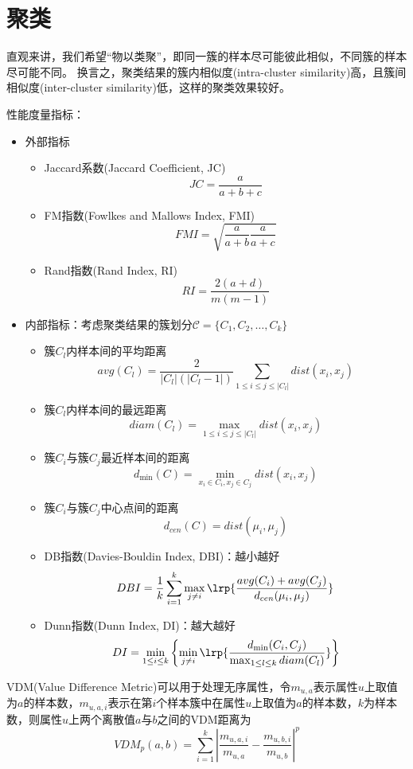 
\section{聚类}
直观来讲，我们希望“物以类聚”，即同一簇的样本尽可能彼此相似，不同簇的样本尽可能不同。
换言之，聚类结果的簇内相似度(intra-cluster similarity)高，且簇间相似度(inter-cluster similarity)低，这样的聚类效果较好。

性能度量指标：
\begin{itemize}
\item 外部指标
\begin{itemize}
	\item Jaccard系数(Jaccard Coefficient, JC)
	\[JC=\frac{a}{a+b+c}\]
	\item FM指数(Fowlkes and Mallows Index, FMI)
	\[FMI=\sqrt{\frac{a}{a+b}\frac{a}{a+c}}\]
	\item Rand指数(Rand Index, RI)
	\[RI=\frac{2(a+d)}{m(m-1)}\]
\end{itemize}
\item 内部指标：考虑聚类结果的簇划分$\mathcal{C}=\{C_1,C_2,\ldots,C_k\}$
\begin{itemize}
	\item 簇$C_l$内样本间的平均距离
	\[avg(C_l)=\frac{2}{|C_l|(|C_l-1|)}\sum_{1\leq i\leq j\leq |C_l|}dist(x_i,x_j)\]
	\item 簇$C_l$内样本间的最远距离
	\[diam(C_l)=\max_{1\leq i\leq j\leq |C_l|}dist(x_i,x_j)\]
	\item 簇$C_i$与簇$C_j$最近样本间的距离
	\[d_{\min}(C)=\min_{x_i\in C_i,x_j\in C_j}dist(x_i,x_j)\]
	\item 簇$C_i$与簇$C_j$中心点间的距离
	\[d_{cen}(C)=dist(\mu_i,\mu_j)\]
	\item DB指数(Davies-Bouldin Index, DBI)：越小越好
	\[DBI=\frac{1}{k}\sum_{i=1}^k\max_{j\ne i}\lrp{\frac{avg(C_i)+avg(C_j)}{d_{cen}(\mu_i,\mu_j)}}\]
	\item Dunn指数(Dunn Index, DI)：越大越好
	\[DI=\min_{1\leq i\leq k}\left\{\min_{j\ne i}\lrp{\frac{d_{\min}(C_i,C_j)}{\max_{1\leq l\leq k}diam(C_l)}}\right\}\]
\end{itemize}
\end{itemize}

VDM(Value Difference Metric)可以用于处理无序属性，令$m_{u,a}$表示属性$u$上取值为$a$的样本数，$m_{u,a,i}$表示在第$i$个样本簇中在属性$u$上取值为$a$的样本数，$k$为样本数，则属性$u$上两个离散值$a$与$b$之间的VDM距离为
\[VDM_p(a,b)=\sum_{i=1}^k\left|\frac{m_{u,a,i}}{m_{u,a}}-\frac{m_{u,b,i}}{m_{u,b}}\right|^p\]

